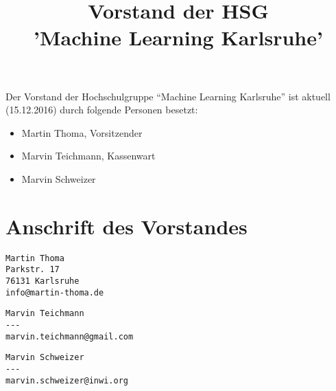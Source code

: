 \documentclass[a4paper]{scrartcl}
\title{Vorstand der HSG\\'Machine Learning Karlsruhe'}
\author{}
\begin{document}
\maketitle

Der Vorstand der Hochschulgruppe \enquote{Machine Learning Karlsruhe}
ist aktuell (15.12.2016) durch folgende Personen besetzt:

\begin{itemize}
    \item Martin Thoma, Vorsitzender
    \item Marvin Teichmann, Kassenwart
    \item Marvin Schweizer
\end{itemize}

\section*{Anschrift des Vorstandes}

\begin{verbatim}
Martin Thoma
Parkstr. 17
76131 Karlsruhe
info@martin-thoma.de
\end{verbatim}

\begin{verbatim}
Marvin Teichmann
---
marvin.teichmann@gmail.com
\end{verbatim}

\begin{verbatim}
Marvin Schweizer
---
marvin.schweizer@inwi.org
\end{verbatim}
\end{document}
